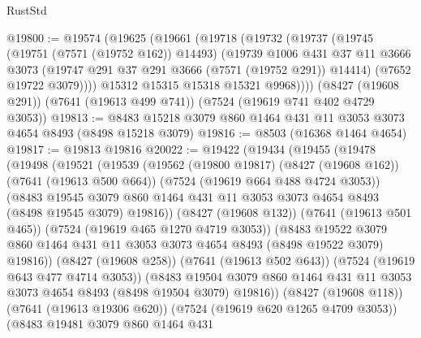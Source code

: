 \begin{lexlean}{RustStd}
\begin{coremodule}
{\begin{coremodule}
{{{{{{{{{{{{{{{{{{{{{{{{{{{{{{{{@19800 := @19574
    (@19625
      (@19661
        (@19718
          (@19732
            (@19737
              (@19745
                (@19751 (@7571 (@19752 @162)) @14493)
                (@19739
                  @1006
                  @431
                  @37
                  @11
                  @3666
                  @3073
                  (@19747 @291 @37 @291 @3666 (@7571 (@19752 @291)) @14414)
                  (@7652 @19722 @3079))))
            @15312
            @15315
            @15318
            @15321
            @9968))))
    (@8427 (@19608 @291))
    (@7641 (@19613 @499 @741))
    (@7524 (@19619 @741 @402 @4729 @3053))
@19813 := @8483 @15218 @3079 @860 @1464 @431 @11 @3053 @3073 @4654 @8493 (@8498 @15218 @3079)
@19816 := @8503 (@16368 @1464 @4654)
@19817 := @19813 @19816
@20022 := @19422
    (@19434
      (@19455
        (@19478
          (@19498
            (@19521
              (@19539
                (@19562
                  (@19800 @19817)
                  (@8427 (@19608 @162))
                  (@7641 (@19613 @500 @664))
                  (@7524 (@19619 @664 @488 @4724 @3053))
                  (@8483
                    @19545
                    @3079
                    @860
                    @1464
                    @431
                    @11
                    @3053
                    @3073
                    @4654
                    @8493
                    (@8498 @19545 @3079)
                    @19816))
                (@8427 (@19608 @132))
                (@7641 (@19613 @501 @465))
                (@7524 (@19619 @465 @1270 @4719 @3053))
                (@8483
                  @19522
                  @3079
                  @860
                  @1464
                  @431
                  @11
                  @3053
                  @3073
                  @4654
                  @8493
                  (@8498 @19522 @3079)
                  @19816))
              (@8427 (@19608 @258))
              (@7641 (@19613 @502 @643))
              (@7524 (@19619 @643 @477 @4714 @3053))
              (@8483
                @19504
                @3079
                @860
                @1464
                @431
                @11
                @3053
                @3073
                @4654
                @8493
                (@8498 @19504 @3079)
                @19816))
            (@8427 (@19608 @118))
            (@7641 (@19613 @19306 @620))
            (@7524 (@19619 @620 @1265 @4709 @3053))
            (@8483
              @19481
              @3079
              @860
              @1464
              @431
}}}}}}}}}}}}}}}}}}}}}}}}}}}}}}}}
\end{coremodule}}
\end{coremodule}
\end{lexlean}
